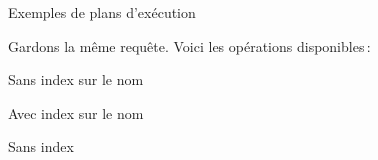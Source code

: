 \begin{tsp}{Exemples de plans d'exécution}{

Gardons la même requête. Voici les opérations disponibles\,:\\


}\end{tsp}
\begin{tsp}{Sans index sur le nom}{

}\end{tsp}
\begin{tsp}{Avec index sur le nom}{

}\end{tsp}
\begin{tsp}{Sans index}{

}\end{tsp}

